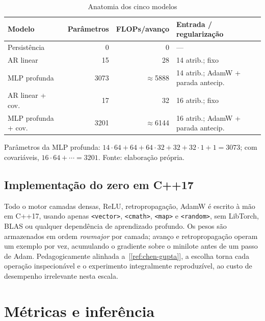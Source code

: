 \documentclass[12pt,a4paper,oneside]{article}
\newcommand{\C}[1]{[\ref{#1}]}
\begin{document}
\begin{table}[H]
\centering
\caption{Anatomia dos cinco modelos}
\label{tab:modelos}
\small
\begin{tabular}{@{}lrrl@{}}
\toprule
\textbf{Modelo} & \textbf{Parâmetros} & \textbf{FLOPs/avanço} & \textbf{Entrada / regularização} \\
\midrule
Persistência       & 0          & 0            & --- \\
AR linear          & 15         & 28           & 14 atrib.; fixo \\
MLP profunda       & \num{3073} & $\approx$\num{5888} & 14 atrib.; AdamW + parada antecip. \\
AR linear + cov.   & 17         & 32           & 16 atrib.; fixo \\
MLP profunda + cov.& \num{3201} & $\approx$\num{6144} & 16 atrib.; AdamW + parada antecip. \\
\bottomrule
\end{tabular}
\par\smallskip
{\footnotesize Parâmetros da MLP profunda: $14{\cdot}64{+}64+64{\cdot}32{+}32+32{\cdot}1{+}1=\num{3073}$;
com covariáveis, $16{\cdot}64{+}\cdots=\num{3201}$. Fonte: elaboração própria.}
\end{table}

\subsection{Implementação do zero em C++17}

Todo o motor \textemdash{} camadas densas, ReLU, retropropagação, AdamW
\textemdash{} é escrito à mão em C++17, usando apenas \texttt{<vector>},
\texttt{<cmath>}, \texttt{<map>} e \texttt{<random>}, sem LibTorch, BLAS ou
qualquer dependência de aprendizado profundo. Os pesos são armazenados em
ordem \emph{row\-major} por camada; avanço e retropropagação operam um
exemplo por vez, acumulando o gradiente sobre o minilote antes de um passo
de Adam. Pedagogicamente alinhada a~\C{ref:chen-gupta}, a escolha torna
cada operação inspecionável e o experimento integralmente reproduzível, ao
custo de desempenho irrelevante nesta escala.

\section{Métricas e inferência}
\label{sec:metricas}
\end{document}
